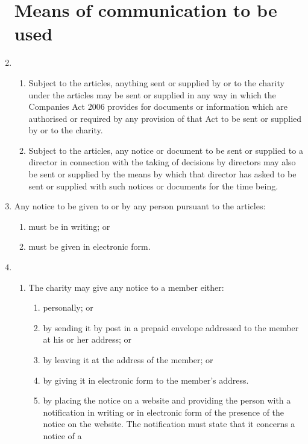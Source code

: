 \documentclass{article}
\begin{document}
\begin{enumerate}[label=\arabic*, start=23]
    \section{Means of communication to be used}
    \item \begin{enumerate}[label=(\arabic*)]
        \item Subject to the articles, anything sent or supplied by or to the
        charity under the articles may be sent or supplied in any way
        in which the Companies Act 2006 provides for documents or
        information which are authorised or required by any provision of
        that Act to be sent or supplied by or to the charity.
        \item Subject to the articles, any notice or document to be sent or
        supplied to a director in connection with the taking of decisions
        by directors may also be sent or supplied by the means by
        which that director has asked to be sent or supplied with such
        notices or documents for the time being.
    \end{enumerate}
    \item Any notice to be given to or by any person pursuant to the articles:
    \begin{enumerate}[label=(\arabic*)]
        \item must be in writing; or
        \item must be given in electronic form.
    \end{enumerate}
    \item \begin{enumerate}[label=(\arabic*)]
        \item The charity may give any notice to a member either:
        \begin{enumerate}[label=(\alph*)]
            \item personally; or
            \item by sending it by post in a prepaid envelope addressed to
            the member at his or her address; or
            \item by leaving it at the address of the member; or
            \item by giving it in electronic form to the member’s address.
            \item by placing the notice on a website and providing the
            person with a notification in writing or in electronic
            form of the presence of the notice on the website. The
            notification must state that it concerns a notice of a

\end{enumerate}
\end{enumerate}
\end{enumerate}
\end{document}
